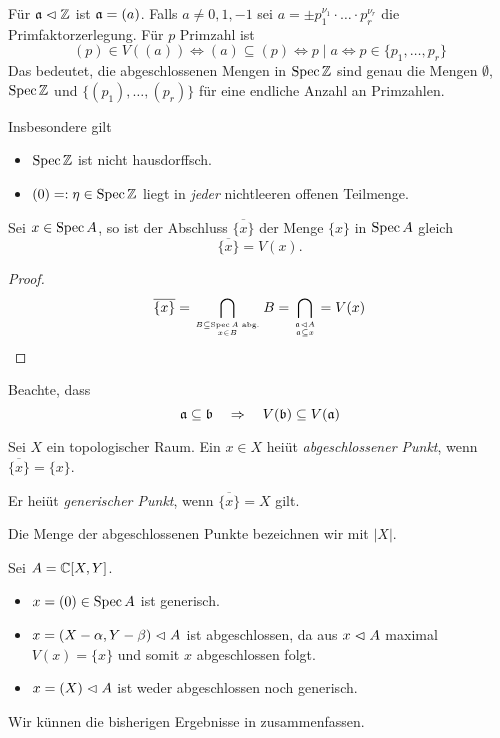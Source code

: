 \begin{beispiel}[$\Spec \Z$]
	Für $\mathfrak{a} \vartriangleleft \mathbb{Z}$ ist $\mathfrak{a} = (a)$. Falls $a \neq 0,1,-1$ sei
	$a = \pm p_1^{\nu_1} \cdot \dots \cdot p_r^{\nu_r}$ die 
	Primfaktorzerlegung. Für $p$ Primzahl ist
	\[
		(p) \in V((a)) \Leftrightarrow
		(a) \subseteq (p) \Leftrightarrow
		p \mid a \Leftrightarrow
		p \in \{p_1,\ldots, p_r\}
	\]
	Das bedeutet, die abgeschlossenen Mengen in $\Spec \Z$ sind genau die 
	Mengen $\emptyset$, $\Spec \Z$ und
	$\{(p_1), \ldots, (p_r)\}$ für eine endliche Anzahl an Primzahlen.
	
	Insbesondere gilt
	\begin{itemize}
	  \item $\Spec\Z$ ist nicht hausdorffsch.
	  \item $(0) =: \eta \in \operatorname{Spec}\mathbb{Z}$ liegt in \emph{jeder} nichtleeren 
	  	offenen Teilmenge.
	\end{itemize}
\end{beispiel}

\begin{lemma}
	Sei $x \in \operatorname{Spec} A$, so ist der Abschluss $\overline{\{x\}}$ der
	Menge $\{x\}$ in $\operatorname{Spec} A$ gleich
	\[\overline{\{x\}} = V(x).\]
\end{lemma}
\begin{proof}
	\[
		\overline{\{x\}} = 
		\bigcap_{B\subseteq \operatorname{Spec} A \text{ abg.}\atop x\in B} B
		= \bigcap_{\mathfrak{a}\vartriangleleft A\atop \mathfrak{a} \subseteq x}
		= V(x)
	\]
\end{proof}

\begin{bemerkung}
	Beachte, dass
	\[
		\mathfrak{a} \subseteq \mathfrak b \quad \Rightarrow\quad
		V(\mathfrak b) \subseteq V(\mathfrak{a})
	\]
\end{bemerkung}

\begin{definition}
	Sei $X$ ein topologischer Raum.
	Ein $x\in X$ heiüt \emph{abgeschlossener Punkt}, wenn
	$\overline{\{x\}} = \{x\}$.
	
	Er heiüt \emph{generischer Punkt}, wenn $\overline{\{x\}} = X$ gilt.
	
	Die Menge der abgeschlossenen Punkte bezeichnen wir mit
	$|X|$.
\end{definition}

\begin{beispiel}
	Sei $A = \mathbb{C}[X,Y]$. 
	\begin{itemize}
	  \item $x = (0) \in \operatorname{Spec} A$ ist generisch.
	  \item $x = (X-\alpha, Y-\beta) \vartriangleleft A$ ist abgeschlossen,
	  	da aus $x \vartriangleleft A$ maximal $V(x) = \{x\}$ und somit $x$ abgeschlossen
	  	folgt.
	  \item $x = (X) \vartriangleleft A$ ist weder abgeschlossen noch generisch.
	\end{itemize}
	Wir künnen die bisherigen Ergebnisse in
	 zusammenfassen. 
\end{beispiel}

